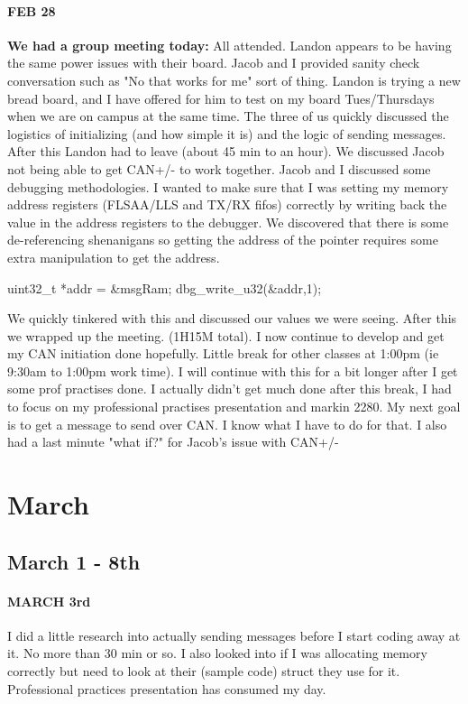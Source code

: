 \documentclass{article}
\begin{document}
\paragraph{FEB 28} \textbf{We had a group meeting today:} All attended. Landon appears to be having the same power issues with their board. Jacob and I provided sanity check conversation such as "No that works for me" sort of thing. Landon is trying a new bread board, and I have offered for him to test on my board Tues/Thursdays when we are on campus at the same time. The three of us quickly discussed the logistics of initializing (and how simple it is) and the logic of sending messages. After this Landon had to leave (about 45 min to an hour). We discussed Jacob not being able to get CAN+/- to work together. Jacob and I discussed some debugging methodologies. I wanted to make sure that I was setting my memory address registers (FLSAA/LLS and TX/RX fifos) correctly by writing back the value in the address registers to the debugger. We discovered that there is some de-referencing shenanigans so getting the address of the pointer requires some extra manipulation to get the address. 
\begin{verbatim*}
uint32_t *addr = &msgRam;
dbg_write_u32(&addr,1);
\end{verbatim*}
We quickly tinkered with this and discussed our values we were seeing. After this we wrapped up the meeting. (1H15M total). I now continue to develop and get my CAN initiation done hopefully. Little break for other classes at 1:00pm (ie 9:30am to 1:00pm work time). I will continue with this for a bit longer after I get some prof practises done. I actually didn't get much done after this break, I had to focus on my professional practises presentation and markin 2280. My next goal is to get a message to send over CAN. I know what I have to do for that. I also had a last minute "what if?" for Jacob's issue with CAN+/-
\section{March}
\subsection{March 1 - 8th}
\paragraph{MARCH 3rd} I did a little research into actually sending messages before I start coding away at it. No more than 30 min or so. I also looked into if I was allocating memory correctly but need to look at their (sample code) struct they use for it. Professional practices presentation has consumed my day.
\end{document}

